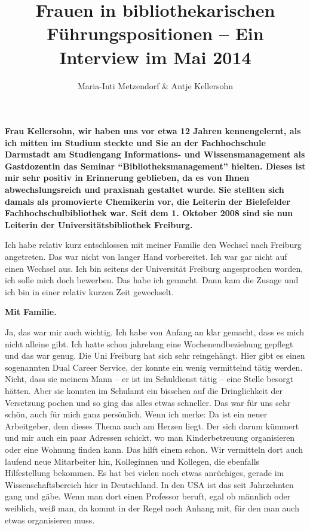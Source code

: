 \documentclass[a4paper,
fontsize=11pt,
oneside,
numbers=noperiodatend,
parskip=half-,
bibliography=totoc,
final
]{scrartcl}
\title{\LARGE{Frauen in bibliothekarischen Führungspositionen – Ein Interview im Mai 2014}} %
\author{Maria-Inti Metzendorf \& Antje Kellersohn} %
\date{}
\begin{document}
\maketitle
\thispagestyle{fancyplain} 


\textbf{Frau Kellersohn, wir haben uns vor etwa 12 Jahren kennengelernt,
als ich mitten im Studium steckte und Sie an der Fachhochschule
Darmstadt am Studiengang Informations- und Wissensmanagement als
Gastdozentin das Seminar \enquote{Bibliotheksmanagement} hielten. Dieses
ist mir sehr positiv in Erinnerung geblieben, da es von Ihnen
abwechslungsreich und praxisnah gestaltet wurde. Sie stellten sich
damals als promovierte Chemikerin vor, die Leiterin der Bielefelder
Fachhochschulbibliothek war. Seit dem 1. Oktober 2008 sind sie nun
Leiterin der Universitätsbibliothek Freiburg.}

Ich habe relativ kurz entschlossen mit meiner Familie den Wechsel nach
Freiburg angetreten. Das war nicht von langer Hand vorbereitet. Ich war
gar nicht auf einen Wechsel aus. Ich bin seitens der Universität
Freiburg angesprochen worden, ich solle mich doch bewerben. Das habe ich
gemacht. Dann kam die Zusage und ich bin in einer relativ kurzen Zeit
gewechselt.

\textbf{Mit Familie.}

Ja, das war mir auch wichtig. Ich habe von Anfang an klar gemacht, dass
es mich nicht alleine gibt. Ich hatte schon jahrelang eine
Wochenendbeziehung gepflegt und das war genug. Die Uni Freiburg hat sich
sehr reingehängt. Hier gibt es einen sogenannten Dual Career Service,
der konnte ein wenig vermittelnd tätig werden. Nicht, dass sie meinem
Mann -- er ist im Schuldienst tätig -- eine Stelle besorgt hätten. Aber
sie konnten im Schulamt ein bisschen auf die Dringlichkeit der
Versetzung pochen und so ging das alles etwas schneller. Das war für uns
sehr schön, auch für mich ganz persönlich. Wenn ich merke: Da ist ein
neuer Arbeitgeber, dem dieses Thema auch am Herzen liegt. Der sich darum
kümmert und mir auch ein paar Adressen schickt, wo man Kinderbetreuung
organisieren oder eine Wohnung finden kann. Das hilft einem schon. Wir
vermitteln dort auch laufend neue Mitarbeiter hin, Kolleginnen und
Kollegen, die ebenfalls Hilfestellung bekommen. Es hat bei vielen noch
etwas anrüchiges, gerade im Wissenschaftsbereich hier in Deutschland. In
den USA ist das seit Jahrzehnten gang und gäbe. Wenn man dort einen
Professor beruft, egal ob männlich oder weiblich, weiß man, da kommt in
der Regel noch Anhang mit, für den man auch etwas organisieren muss.
\end{document}
